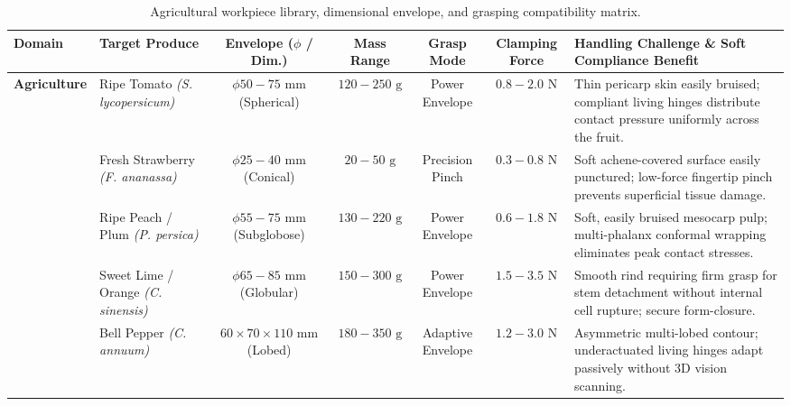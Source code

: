 \documentclass[12pt,a4paper]{report}
\begin{document}
\begin{table}[htbp]
\centering
\small
\caption{Agricultural workpiece library, dimensional envelope, and grasping compatibility matrix.}
\label{tab:workpiece_library}
\begin{tabularx}{\textwidth}{l p{2.8cm} c c c c X}
\toprule
\textbf{Domain} & \textbf{Target Produce} & \textbf{Envelope ($\phi$ / Dim.)} & \textbf{Mass Range} & \textbf{Grasp Mode} & \textbf{Clamping Force} & \textbf{Handling Challenge \& Soft Compliance Benefit} \\
\midrule
\multirow{5}{*}{\textbf{Agriculture}} 
& Ripe Tomato \newline \textit{(S. lycopersicum)} & $\phi 50 - 75\text{ mm}$ (Spherical) & $120 - 250\text{ g}$ & Power Envelope & $0.8 - 2.0\text{ N}$ & Thin pericarp skin easily bruised; compliant living hinges distribute contact pressure uniformly across the fruit. \\
\cmidrule{2-7}
& Fresh Strawberry \newline \textit{(F. ananassa)} & $\phi 25 - 40\text{ mm}$ (Conical) & $20 - 50\text{ g}$ & Precision Pinch & $0.3 - 0.8\text{ N}$ & Soft achene-covered surface easily punctured; low-force fingertip pinch prevents superficial tissue damage. \\
\cmidrule{2-7}
& Ripe Peach / Plum \newline \textit{(P. persica)} & $\phi 55 - 75\text{ mm}$ (Subglobose) & $130 - 220\text{ g}$ & Power Envelope & $0.6 - 1.8\text{ N}$ & Soft, easily bruised mesocarp pulp; multi-phalanx conformal wrapping eliminates peak contact stresses. \\
\cmidrule{2-7}
& Sweet Lime / Orange \newline \textit{(C. sinensis)} & $\phi 65 - 85\text{ mm}$ (Globular) & $150 - 300\text{ g}$ & Power Envelope & $1.5 - 3.5\text{ N}$ & Smooth rind requiring firm grasp for stem detachment without internal cell rupture; secure form-closure. \\
\cmidrule{2-7}
& Bell Pepper \newline \textit{(C. annuum)} & $60 \times 70 \times 110\text{ mm}$ (Lobed) & $180 - 350\text{ g}$ & Adaptive Envelope & $1.2 - 3.0\text{ N}$ & Asymmetric multi-lobed contour; underactuated living hinges adapt passively without 3D vision scanning. \\
\bottomrule
\end{tabularx}
\end{table}
\end{document}
